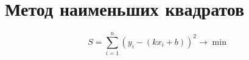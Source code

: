 \documentclass[14pt]{extarticle}
\author{koftamainee}
\date{\today}
\title{}
\begin{document}
\tableofcontents

\section{Метод наименьших квадратов}
\label{sec:orgfd11b5c}
$$ S = \sum_{i=1}^{n} (y_i - (kx_i + b))^2 \to \min $$
\end{document}
